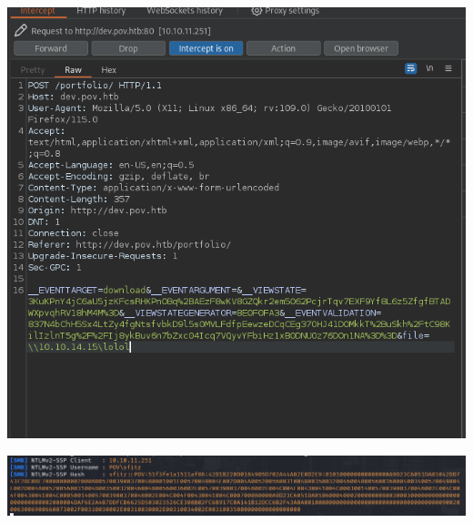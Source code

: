 \documentclass[a4paper]{article}
\begin{document}
              \begin{minipage}[c]{\textwidth}
          \centering
          \includegraphics[width=\textwidth]{src/issues/2 - POV/issue22.png}
          \label{2:POV:issue.md:issue22.png}
          \vspace{4ex}
        \end{minipage}
              \begin{minipage}[c]{\textwidth}
          \centering
          \includegraphics[width=\textwidth]{src/issues/2 - POV/issue23.png}
          \label{2:POV:issue.md:issue23.png}
          \vspace{4ex}
        \end{minipage}
\end{document}
